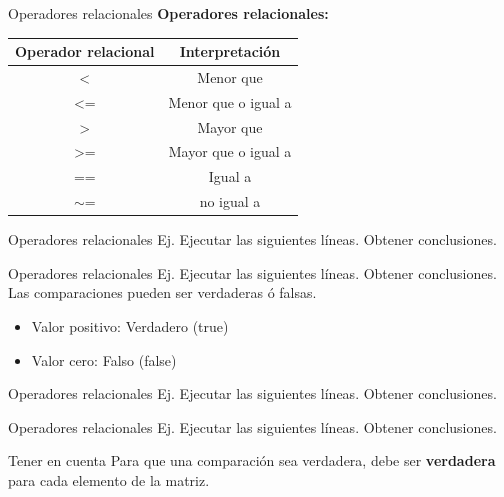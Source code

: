 \documentclass{bredelebeamer}
\begin{document}
\begin{frame}{Operadores relacionales}
\textbf{Operadores relacionales:}
\begin{table}[]
\centering
\begin{tabular}{|c|c|}
\hline
Operador relacional & Interpretación      \\ \hline
\textless{}         & Menor que           \\ \hline
\textless{}=        & Menor que o igual a \\ \hline
\textgreater{}      & Mayor que           \\ \hline
\textgreater{}=     & Mayor que o igual a \\ \hline
==                  & Igual a             \\ \hline
$\sim$=             & no igual a          \\ \hline
\end{tabular}
\end{table}
\end{frame}

\begin{frame}{Operadores relacionales}
Ej. Ejecutar las siguientes líneas. Obtener conclusiones.
\end{frame}

\begin{frame}{Operadores relacionales}
Ej. Ejecutar las siguientes líneas. Obtener conclusiones.
Las comparaciones pueden ser verdaderas ó falsas. 
\begin{itemize}
\item Valor positivo: Verdadero (true)
\item Valor cero: Falso (false)
\end{itemize}
\end{frame}

\begin{frame}{Operadores relacionales}
Ej. Ejecutar las siguientes líneas. Obtener conclusiones.
\end{frame}

\begin{frame}{Operadores relacionales}
Ej. Ejecutar las siguientes líneas. Obtener conclusiones.
\begin{alertblock}{Tener en cuenta}
Para que una comparación sea verdadera, debe ser \textbf{verdadera} para cada elemento de la matriz.
\end{alertblock}
\end{frame}
\end{document}
